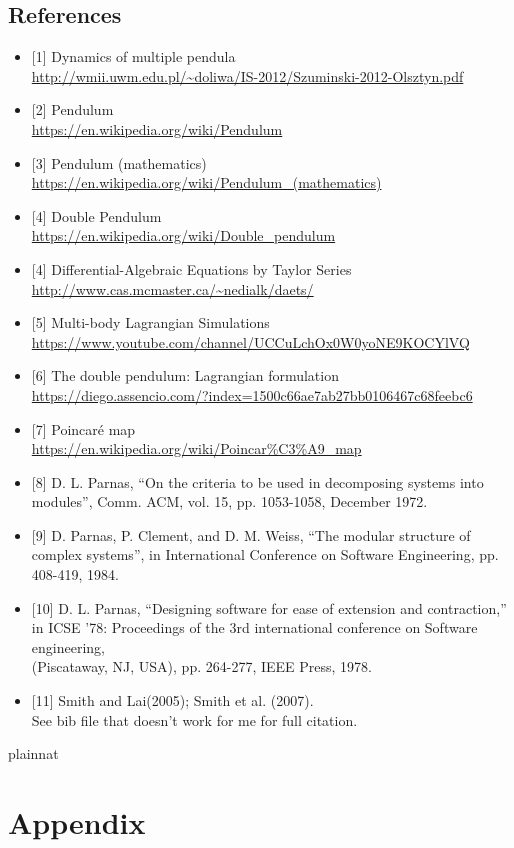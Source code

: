 \documentclass[12pt, titlepage]{article}
\begin{document}
\subsection*{References}\label{ssec:ref} 
\begin{itemize}
\item{[1]} Dynamics of multiple pendula \\\url{http://wmii.uwm.edu.pl/~doliwa/IS-2012/Szuminski-2012-Olsztyn.pdf}
\item{[2]} Pendulum \\\url{https://en.wikipedia.org/wiki/Pendulum}
\item{[3]} Pendulum (mathematics)
\\\url{https://en.wikipedia.org/wiki/Pendulum_(mathematics)}
\item{[4]} Double Pendulum
\\\url{https://en.wikipedia.org/wiki/Double_pendulum}\item{[4]}
Differential-Algebraic Equations by Taylor Series
\\\url{http://www.cas.mcmaster.ca/~nedialk/daets/}
\item{[5]} Multi-body Lagrangian Simulations
\\\url{https://www.youtube.com/channel/UCCuLchOx0W0yoNE9KOCYlVQ}
\item{[6]} The double pendulum: Lagrangian formulation
\\\url{https://diego.assencio.com/?index=1500c66ae7ab27bb0106467c68feebc6}
\item{[7]} Poincaré map
\\\url{https://en.wikipedia.org/wiki/Poincar%C3%A9_map}
\item{[8]} D. L. Parnas, ``On the criteria to be used in decomposing systems into modules'', Comm.
ACM, vol. 15, pp. 1053-1058, December 1972.
\item{[9]} D. Parnas, P. Clement, and D. M. Weiss, ``The modular structure of complex systems'',
in International Conference on Software Engineering, pp. 408-419, 1984.
\item{[10]} D. L. Parnas, ``Designing software for ease of extension and contraction,'' in ICSE '78:
Proceedings of the 3rd international conference on Software engineering, \\
(Piscataway, NJ, USA), pp. 264-277, IEEE Press, 1978.
\item{[11]} Smith and Lai(2005); Smith et al. (2007). \\
See bib file that doesn't work for me for full citation.
\end{itemize}

 {plainnat}


\newpage

\section{Appendix} \label{Appendix}

\end{document}
